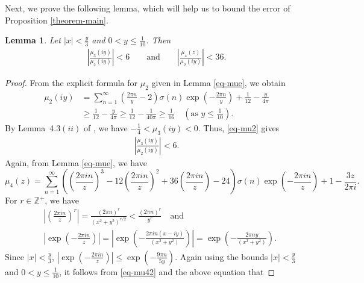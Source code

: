 \documentclass[11pt]{amsart}
\theoremstyle{plain}
\newtheorem{lemma}[theorem]{Lemma}
\numberwithin{equation}{section}
\begin{document}
	Next, we prove the following lemma, which will help us to bound the error of Proposition \ref{theorem-main}.
	\begin{lemma}\label{lemma-mu234}
		Let $|x|<\frac{y}{3}$ and $0<y\le\frac{1}{10}$. Then
		\begin{align*}
			\left|\frac{\mu_{3}(iy)}{\mu_2(iy)}\right|<6\qquad\text{and}  \qquad\left|\frac{\mu_{4}(z)}{\mu_2(iy)}\right|<36.   
		\end{align*}
	\end{lemma}
	\begin{proof}
		From the explicit formula for $\mu_2$ given in Lemma \ref{eq-mue}, we obtain
		\begin{equation}\label{eq-mu2}
			\begin{aligned}
				\mu_{2}(iy)&=\sum_{n=1}^{\infty}\left(\frac{2\pi n}{y}-2\right)\sigma(n) \exp\left(-\frac{2\pi n}{y}\right)+\frac{1}{12}-\frac{y}{4\pi}\\
				&\ge \frac{1}{12}-\frac{y}{4\pi}\ge \frac{1}{12}-\frac{1}{40\pi}\ge \frac{1}{16}\quad\left(\text{as $y\le\frac{1}{10}$}\right).
			\end{aligned} 
		\end{equation}
		By Lemma~4.3$(ii)$ of \cite{tyler2026asymptotics}, we have $-\frac{1}{4}<\mu_3(iy)<0$. Thus, \eqref{eq-mu2} gives
		\begin{align*}
			\left|\frac{\mu_{3}(iy)}{\mu_2(iy)}\right|<6. 
		\end{align*}
		Again, from Lemma \ref{eq-mue}, we have
		\begin{equation}\label{eq-mu42}
			\mu_{4}(z)=\sum_{n=1}^{\infty}\left(\left(\frac{2\pi in}{z}\right)^{3}-12\left(\frac{2\pi in}{z}\right)^{2}+36\left(\frac{2\pi in}{z}\right)-24\right)\sigma(n)\exp\left(-\frac{2\pi in}{z}\right)+1-\frac{3z}{2\pi i}.   
		\end{equation}
		For $r\in \mathbb{Z^{+}}$, we have
		\begin{align*}
			& \left|\left(\frac{2\pi in}{z}\right)^{r}\right| =\frac{(2\pi n)^{r}}{(x^{2}+y^{2})^{r/2}}<\frac{(2\pi n)^{r}}{y^{r}} \quad \text{and}\\
			& \left|\exp\left(-\frac{2\pi in}{z}\right)\right|= \left|\exp\left(-\frac{2\pi in(x-iy)}{(x^{2}+y^{2})}\right)\right|=\exp\left(-\frac{2\pi ny}{(x^{2}+y^{2})}\right).
		\end{align*}
		Since $|x|<\frac{y}{3}$, $\left|\exp\left(-\frac{2\pi in}{z}\right)\right|\le \exp\left(-\frac{9\pi n}{5y}\right).$ Again using the bounds $|x|<\frac{y}{3}$ and $0<y\le \frac{1}{10}$, it follows from \eqref{eq-mu42} and the above equation that

\end{proof}
\end{document}
